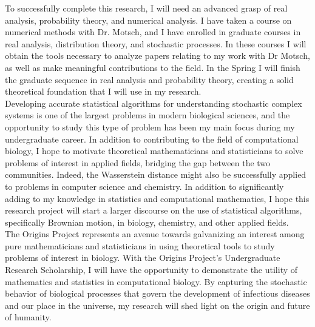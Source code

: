 \documentclass[8 pt, leqno]{article}
\begin{document}
\indent To successfully complete this research, I will need an advanced grasp of real analysis, probability theory, and numerical analysis. I have taken a course on numerical methods with Dr. Motsch, and I have enrolled in graduate courses in real analysis, distribution theory, and stochastic processes. In these courses I will obtain the tools necessary to analyze papers relating to my work with Dr Motsch, as well as make meaningful contributions to the field. In the Spring I will finish the graduate sequence in real analysis and probability theory, creating a solid theoretical foundation that I will use in my research.\\
\indent Developing accurate statistical algorithms for understanding stochastic complex systems is one of the largest problems in modern biological sciences, and the opportunity to study this type of problem has been my main focus during my undergraduate career. In addition to contributing to the field of computational biology, I hope to motivate theoretical mathematicians and statisticians to solve problems of interest in applied fields, bridging the gap between the two communities.
Indeed, the Wasserstein distance might also be successfully applied to problems in computer science and chemistry. In addition to significantly adding to my knowledge in statistics and computational mathematics, I hope this research project will start a larger discourse on the use of statistical algorithms, specifically Brownian motion, in biology, chemistry, and other applied fields. \\
\indent The Origins Project represents an avenue towards galvanizing an interest among pure mathematicians and statisticians in using theoretical tools to study problems of interest in biology. With the Origins Project’s Undergraduate Research Scholarship, I will have the opportunity to demonstrate the utility of mathematics and statistics in computational biology. By capturing the stochastic behavior of biological processes that govern the development of infectious diseases and our place in the universe, my research will shed light on the origin and future of humanity.




 
\end{document}
